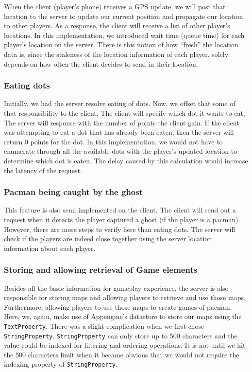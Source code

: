 \documentclass{acm_proc_article-sp}
\begin{document}
When the client (player's phone) receives a GPS update, we will post
that location to the server to update our current position and
propagate our location to other players. As a response, the client
will receive a list of other player's locations. In this
implementation, we introduced wait time (queue time) for each
player's location on the server. There is this notion of how ``fresh''
the location data is, since the staleness of the location information
of each player, solely depends on how often the client decides to send
in their location. 

\subsubsection{Eating dots}
Initially, we had the server resolve eating of dots. Now, we offset
that some of that responsibility to the client. The client will
specify which dot it wants to eat. The server will response with the
number of points the client gain. If the client was attempting to eat
a dot that has already been eaten, then the server will return 0
points for the dot. In this implementation, we would not have to
enumerate through all the available dots with the player's updated
location to determine which dot is eaten. The delay caused by this
calculation would increase the latency of the request.

\subsubsection{Pacman being caught by the ghost}
This feature is also semi implemented on the client. The client will
send out a request when it detects the player captured a ghost (if the
player is a pacman). However, there are more steps to verify here than
eating dots. The server will check if the players are indeed close
together using the server location information about each player.

\subsubsection{Storing and allowing retrieval of Game elements}
Besides all the basic information for gameplay experience, the server
is also responsible for storing maps and allowing players to retrieve
and use those maps. Furthermore, allowing players to use those maps to
create games of pacman. Here, we, again, make use of Appengine's
datastore to store our maps using the \texttt{TextProperty}. There was
a slight complication when we first chose
\texttt{StringProperty}. \texttt{StringProperty} can only store up to
500 characters and the value could be indexed for filtering and
ordering operations. It is not until we hit the 500 characters limit
when it became obvious that we would not require the indexing property
of \texttt{StringProperty}.
\end{document}
